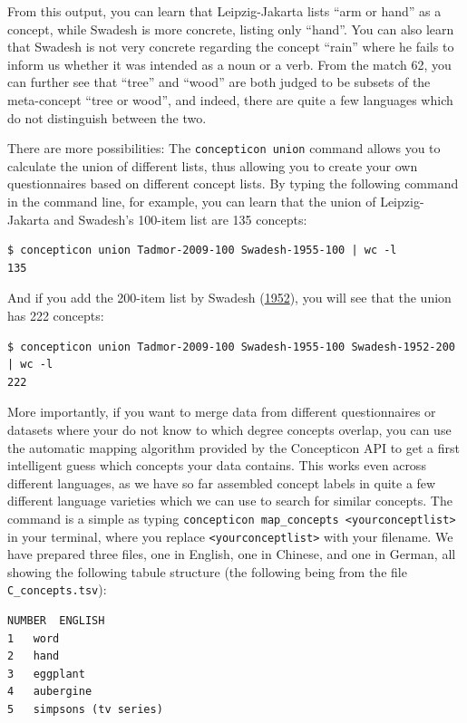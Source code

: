 \documentclass[a4paper,svgnames]{scrartcl}
\begin{document}
From this output, you can learn that Leipzig-Jakarta lists ``arm or
hand'' as a concept, while Swadesh is more concrete, listing only
``hand''. You can also learn that Swadesh is not very concrete regarding
the concept ``rain'' where he fails to inform us whether it was intended
as a noun or a verb. From the match 62, you can further see that
``tree'' and ``wood'' are both judged to be subsets of the meta-concept
``tree or wood'', and indeed, there are quite a few languages which do
not distinguish between the two.

There are more possibilities: The \texttt{concepticon\ union} command
allows you to calculate the union of different lists, thus allowing you
to create your own questionnaires based on different concept lists. By
typing the following command in the command line, for example, you can
learn that the union of Leipzig-Jakarta and Swadesh's 100-item list are
135 concepts:

\begin{verbatim}
$ concepticon union Tadmor-2009-100 Swadesh-1955-100 | wc -l
135
\end{verbatim}

And if you add the 200-item list by Swadesh
(\href{http://bibliography.lingpy.org?key=Swadesh1952}{1952}), you will
see that the union has 222 concepts:

\begin{verbatim}
$ concepticon union Tadmor-2009-100 Swadesh-1955-100 Swadesh-1952-200 | wc -l
222
\end{verbatim}

More importantly, if you want to merge data from different
questionnaires or datasets where your do not know to which degree
concepts overlap, you can use the automatic mapping algorithm provided
by the Concepticon API to get a first intelligent guess which concepts
your data contains. This works even across different languages, as we
have so far assembled concept labels in quite a few different language
varieties which we can use to search for similar concepts. The command
is a simple as typing
\texttt{concepticon\ map\_concepts\ \textless{}yourconceptlist\textgreater{}}
in your terminal, where you replace
\texttt{\textless{}yourconceptlist\textgreater{}} with your filename. We
have prepared three files, one in English, one in Chinese, and one in
German, all showing the following tabule structure (the following being
from the file \texttt{C\_concepts.tsv}):

\begin{verbatim}
NUMBER  ENGLISH
1   word
2   hand
3   eggplant
4   aubergine
5   simpsons (tv series)
\end{verbatim}
\end{document}
